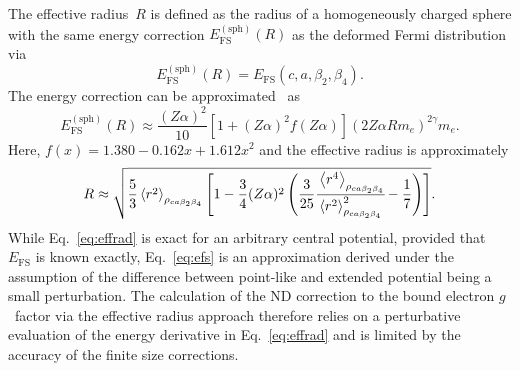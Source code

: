 The effective radius~$R$ is defined as the radius of a homogeneously charged sphere with the same energy correction $E^{(\text{sph})}_{\text{FS}}(R)$ as the deformed Fermi distribution via
\begin{equation}
E^{(\text{sph})}_{\text{FS}}(R) = E_{\text{FS}}(c,a,\beta_2,\beta_4).
\label{eq:effradNum}
\end{equation}
The energy correction can be approximated~\cite{Shabaev1993} as
\begin{equation}
E^{(\text{sph})}_{\text{FS}}(R)\approx\frac{(Z\alpha)^2}{10}\left[{1}{+}(Z\alpha)^2f(Z\alpha) \right](2Z\alpha R m_e)^{2\gamma}m_e.
\label{eq:efs}
\end{equation}
Here, $f(x)=1.380-0.162x+1.612x^2$ and the effective radius is approximately
\small
\begin{equation}
R\approx\sqrt{\frac{5}{3}\left<r^2\right>_{\rho_{ca\beta_2\beta_4}}\left[ 1-\frac{3}{4}(Z\alpha)^2 \left( \frac{3}{25}\cfrac{\left<r^4\right>_{\rho_{ca\beta_2\beta_4}}}{\left<r^2\right>^2_{\rho_{ca\beta_2\beta_4}}}-\frac{1}{7} \right) \right]}.
\label{eq:radius}
\end{equation}
\normalsize
While Eq.~\eqref{eq:effrad} is exact for an arbitrary central potential, provided that $E_{\text{FS}}$ is known exactly, Eq.~\eqref{eq:efs} is an approximation derived under the assumption of the difference between point-like and extended potential being a small perturbation. The calculation of the ND correction to the bound electron $g$~factor via the effective radius approach therefore relies on a perturbative evaluation of the energy derivative in Eq.~\eqref{eq:effrad} and is limited by the accuracy of the finite size corrections.

